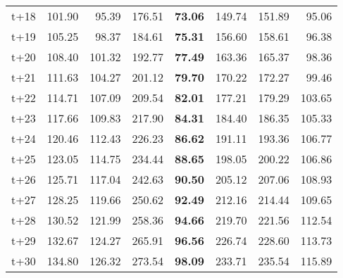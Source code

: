 \begin{table}[H]
\begin{tabular}{lrrrrrrr}
t+18  & 101.90  & 95.39  & 176.51  & \textbf{73.06}  & 149.74  & 151.89  & 95.06  \\
t+19  & 105.25  & 98.37  & 184.61  & \textbf{75.31}  & 156.60  & 158.61  & 96.38  \\
t+20  & 108.40  & 101.32  & 192.77  & \textbf{77.49}  & 163.36  & 165.37  & 98.36  \\
t+21  & 111.63  & 104.27  & 201.12  & \textbf{79.70}  & 170.22  & 172.27  & 99.46  \\
t+22  & 114.71  & 107.09  & 209.54  & \textbf{82.01}  & 177.21  & 179.29  & 103.65  \\
t+23  & 117.66  & 109.83  & 217.90  & \textbf{84.31}  & 184.40  & 186.35  & 105.33  \\
t+24  & 120.46  & 112.43  & 226.23  & \textbf{86.62}  & 191.11  & 193.36  & 106.77  \\
t+25  & 123.05  & 114.75  & 234.44  & \textbf{88.65}  & 198.05  & 200.22  & 106.86  \\
t+26  & 125.71  & 117.04  & 242.63  & \textbf{90.50}  & 205.12  & 207.06  & 108.93  \\
t+27  & 128.25  & 119.66  & 250.62  & \textbf{92.49}  & 212.16  & 214.44  & 109.65  \\
t+28  & 130.52  & 121.99  & 258.36  & \textbf{94.66}  & 219.70  & 221.56  & 112.54  \\
t+29  & 132.67  & 124.27  & 265.91  & \textbf{96.56}  & 226.74  & 228.60  & 113.73  \\
t+30  & 134.80  & 126.32  & 273.54  & \textbf{98.09}  & 233.71  & 235.54  & 115.89  \\

\bottomrule
\end{tabular}
\end{table}
